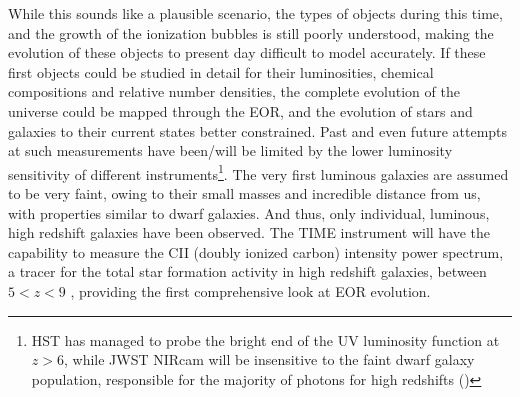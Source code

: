 \documentclass[manuscript]{aastex}
\begin{document}
While this sounds like a plausible scenario, the types of objects during this time, and the growth of the ionization bubbles is still poorly understood, making the evolution of these objects to present day difficult to model accurately. If these first objects could be studied in detail for their luminosities, chemical compositions and relative number densities, the complete evolution of the universe could be mapped through the EOR, and the evolution of stars and galaxies to their current states better constrained. Past and even future attempts at such measurements have been/will be limited by the lower luminosity sensitivity of different instruments\footnote{HST has managed to probe the bright end of the UV luminosity function at \(z > 6\), while JWST NIRcam will be insensitive to the faint dwarf galaxy population, responsible for the majority of photons for high redshifts (\cite{Staniszewski2014})}. The very first luminous galaxies are assumed to be very faint, owing to their small masses and incredible distance from us, with properties similar to dwarf galaxies. 
And thus, only individual, luminous, high redshift galaxies have been observed. The TIME instrument will have the capability to measure the CII (doubly ionized carbon) intensity power spectrum, a tracer for the total star formation activity in high redshift galaxies, between \(5 < z < 9\) , providing the first comprehensive look at EOR evolution. 

\end{document}
